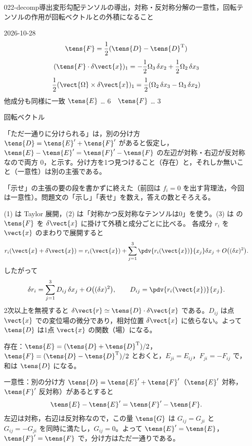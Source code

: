 \documentclass[uplatex,dvipdfmx,a4paper,11pt]{jsarticle}
\begin{document}
\begin{mondai}{022-decomp}{導出}{変形勾配テンソルの導出，対称・反対称分解の一意性，回転テンソルの作用が回転ベクトルとの外積になること}
\begin{kotaeutsushi}{2026-10-28}
\[ \tens{F}=\frac{1}{2}(\tens{D}-\tens{D}^{\mathrm{T}}) \]
\[ (\tens{F}\cdot\delta\vect{x})_{1}=-\frac{1}{2}\Omega_{3}\,\delta x_{2}+\frac{1}{2}\Omega_{2}\,\delta x_{3} \]
\[ \frac{1}{2}(\vect{\Omega}\times\delta\vect{x})_{1}=\frac{1}{2}(\Omega_{2}\,\delta x_{3}-\Omega_{3}\,\delta x_{2}) \]
他成分も同様に一致
$\tens{E}$ … 6　$\tens{F}$ … 3

回転ベクトル
\end{kotaeutsushi}
\begin{kizuki}
\item 「ただ一通りに分けられる」は，別の分け方 $\tens{D}=\tens{E}'+\tens{F}'$ があると仮定し，$\tens{E}-\tens{E}'=\tens{F}'-\tens{F}$ の左辺が対称・右辺が反対称なので両方 0，と示す。分け方を1つ見つけること（存在）と，それしか無いこと（一意性）は別の主張である。
\item {} 「示せ」の主張の要の段を書かずに終えた（前回は $f_{i}=0$ を出す背理法，今回は一意性）。問題文の「示し」「表せ」を数え，答えの数とそろえる。
\end{kizuki}
\begin{tadashii}
\houshin (1) は Taylor 展開，(2) は「対称かつ反対称なテンソルは0」を使う。(3) は  の $\tens{F}$ を $\delta\vect{x}$ に掛けて外積と成分ごとに比べる。
\keisan {} 各成分 $r_i$ を $\vect{x}$ のまわりで展開すると
\[ r_i(\vect{x}+\delta\vect{x})=r_i(\vect{x})+\sum_{j=1}^{3}\pdv{r_i(\vect{x})}{x_j}\delta x_j+O\bigl((\delta x)^{2}\bigr). \]
したがって
\[ \delta r_i=\sum_{j=1}^{3}D_{ij}\,\delta x_j+O\bigl((\delta x)^{2}\bigr),\qquad D_{ij}=\pdv{r_i(\vect{x})}{x_j}. \]
2次以上を無視すると $\delta\vect{r}\simeq\tens{D}\cdot\delta\vect{x}$ である。$D_{ij}$ は点 $\vect{x}$ での変位場の微分であり，相対位置 $\delta\vect{x}$ に依らない。よって $\tens{D}$ は1点 $\vect{x}$ の関数（場）になる。

 存在：$\tens{E}=(\tens{D}+\tens{D}^{\mathrm{T}})/2$，$\tens{F}=(\tens{D}-\tens{D}^{\mathrm{T}})/2$ とおくと，$E_{ji}=E_{ij}$，$F_{ji}=-F_{ij}$ で，和は $\tens{D}$ になる。

一意性：別の分け方 $\tens{D}=\tens{E}'+\tens{F}'$（$\tens{E}'$ 対称，$\tens{F}'$ 反対称）があるとすると
\[ \tens{E}-\tens{E}'=\tens{F}'-\tens{F}. \]
左辺は対称，右辺は反対称なので，この量 $\tens{G}$ は $G_{ij}=G_{ji}$ と $G_{ij}=-G_{ji}$ を同時に満たし，$G_{ij}=0$。よって $\tens{E}'=\tens{E}$，$\tens{F}'=\tens{F}$ で，分け方はただ一通りである。


\end{tadashii}
\end{mondai}
\end{document}
